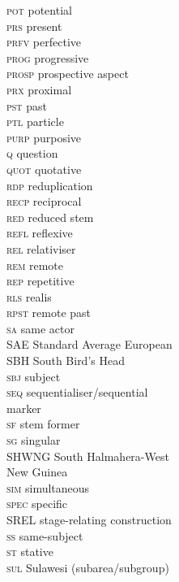 \begin{multicols}{2}
\begin{tabbing}
 \textsc{pot}  \> potential \\
 \textsc{prs}  \> present \\
 \textsc{prfv}  \> perfective \\
 \textsc{prog}  \> progressive \\
 \textsc{prosp}  \> prospective aspect \\
 \textsc{prx}  \> proximal \\
 \textsc{pst}  \> past \\
 \textsc{ptl}  \> particle \\
 \textsc{purp}  \> purposive \\
 \textsc{q}  \> question \\
 \textsc{quot}  \> quotative \\
 \textsc{rdp}  \> reduplication \\
 \textsc{recp}  \> reciprocal \\
 \textsc{red}  \> reduced stem \\
 \textsc{refl}  \> reflexive \\
 \textsc{rel}  \> relativiser \\
 \textsc{rem}  \> remote \\
 \textsc{rep}  \> repetitive \\
 \textsc{rls}  \> realis \\
 \textsc{rpst}  \> remote past \\
 \textsc{sa}  \> same actor \\
 \textsc{SAE}  \> Standard Average European \\
 \textsc{SBH}  \> South Bird's Head \\
 \textsc{sbj}  \> subject \\
 \textsc{seq}  \> sequentialiser\slash sequential\\\> marker \\
 \textsc{sf}  \> stem former \\
 \textsc{sg}  \> singular \\
 \textsc{SHWNG}  \> South Halmahera-West\\\> New Guinea \\
 \textsc{sim}  \> simultaneous \\
 \textsc{spec}  \> specific \\
 \textsc{SREL}  \> stage-relating construction \\
 \textsc{ss}  \> same-subject \\
 \textsc{st}  \> stative \\
 \textsc{sul}  \> Sulawesi (subarea\slash subgroup) \\

\end{tabbing}
\end{multicols}
